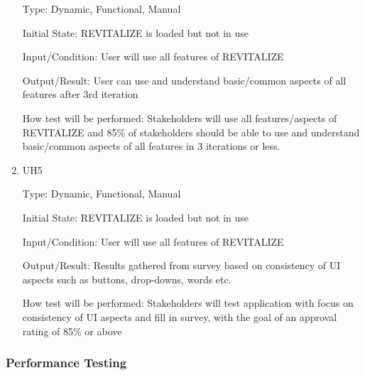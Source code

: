 \documentclass[12pt, titlepage]{article}
\begin{document}
\begin{enumerate}
	Type: Dynamic, Functional, Manual
	
	Initial State: REVITALIZE is loaded but not in use
	
	Input/Condition: User will use all features of REVITALIZE
	
	Output/Result: User can use and understand basic/common aspects of all features after 3rd iteration
	
	How test will be performed: Stakeholders will use all features/aspects of REVITALIZE and 85\% of stakeholders should be able to use and understand basic/common aspects of all features in 3 iterations or less.
	
	\item{UH5\\}
	
	Type: Dynamic, Functional, Manual
	
	Initial State: REVITALIZE is loaded but not in use
	
	Input/Condition: User will use all features of REVITALIZE
	
	Output/Result: Results gathered from survey based on consistency of UI aspects such as buttons, drop-downs, words etc.
	
	How test will be performed: Stakeholders will test application with focus on consistency of UI aspects and fill in survey, with the goal of an approval rating of 85\% or above
	
\end{enumerate}

\subsubsection{Performance Testing}
\end{document}
